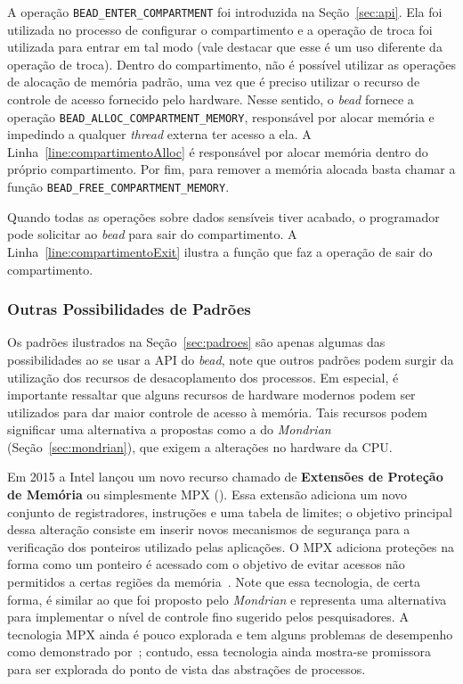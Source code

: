 A operação \texttt{BEAD\_ENTER\_COMPARTMENT} foi introduzida na Seção~\ref{sec:api}. Ela foi
utilizada no processo de configurar o compartimento e a operação de troca foi
utilizada para entrar em tal modo (vale destacar que esse é um uso diferente da
operação de troca). Dentro do compartimento, não é possível utilizar as operações de alocação de memória
padrão, uma vez que é preciso utilizar o recurso de controle de acesso fornecido
pelo hardware. Nesse sentido, o \emph{bead} fornece a operação
\texttt{BEAD\_ALLOC\_COMPARTMENT\_MEMORY}, responsável por alocar memória e impedindo
a qualquer \emph{thread} externa ter acesso a ela.
A Linha~\ref{line:compartimentoAlloc} é responsável por alocar memória
dentro do próprio compartimento. Por fim, para remover a memória alocada basta
chamar a função \texttt{BEAD\_FREE\_COMPARTMENT\_MEMORY}.

Quando todas as operações sobre dados sensíveis tiver acabado, o programador
pode solicitar ao \emph{bead} para sair do compartimento. A
Linha~\ref{line:compartimentoExit} ilustra a função que faz a operação de sair
do compartimento.

\subsubsection{Outras Possibilidades de Padrões}

Os padrões ilustrados na Seção~\ref{sec:padroes} são apenas algumas das
possibilidades ao se usar a API do \emph{bead}, note que outros padrões podem
surgir da utilização dos recursos de desacoplamento dos processos. Em especial,
é importante ressaltar que alguns recursos de hardware modernos podem ser
utilizados para dar maior controle de acesso à memória. Tais recursos podem
significar uma alternativa a propostas como a do \emph{Mondrian}
(Seção~\ref{sec:mondrian}), que exigem a alterações no hardware da CPU.

Em 2015 a Intel lançou um novo recurso chamado de \textbf{Extensões de Proteção
de Memória} ou simplesmente MPX ().
Essa extensão adiciona um novo conjunto de registradores, instruções e uma
tabela de limites; o objetivo principal dessa alteração consiste em inserir
novos mecanismos de segurança para a verificação dos ponteiros utilizado pelas
aplicações. O MPX adiciona proteções na forma como um ponteiro é acessado com o
objetivo de evitar acessos não permitidos a certas regiões da
memória~\citep{mpx}. Note que essa tecnologia, de certa forma, é similar ao que
foi proposto pelo \emph{Mondrian} e representa uma alternativa para implementar
o nível de controle fino sugerido pelos pesquisadores. A tecnologia MPX ainda é
pouco explorada e tem alguns problemas de desempenho como demonstrado
por~\citet{intelmpx}; contudo, essa tecnologia ainda mostra-se promissora para
ser explorada do ponto de vista das abstrações de processos.

